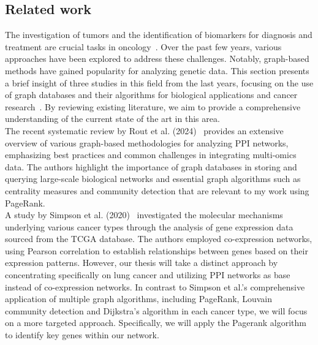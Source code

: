 \subsection{Related work} \label{subsec:related_work}
The investigation of tumors and the identification of biomarkers for diagnosis and treatment are crucial tasks in oncology~\cite{das2024biomarkers}.
Over the past few years, various approaches have been explored to address these challenges.
Notably, graph-based methods have gained popularity for analyzing genetic data.
This section presents a brief insight of three studies in this field from the last years,
focusing on the use of graph databases and their algorithms for biological applications and
cancer research~\cite{rout2024systematic, simpson2020applying, shan2020network}.
By reviewing existing literature, we aim to provide a comprehensive understanding of the current state of the art in this area.
\\

The recent systematic review by Rout et al. (2024)~\cite{rout2024systematic} provides an extensive overview of
various graph-based methodologies for analyzing PPI networks,
emphasizing best practices and common challenges in integrating multi-omics data.
The authors highlight the importance of graph databases in storing and querying large-scale biological networks
and essential graph algorithms such as centrality measures and community detection that are relevant to my work using PageRank.
\\

A study by Simpson et al. (2020)~\cite{simpson2020applying} investigated the molecular mechanisms underlying various cancer types
through the analysis of gene expression data sourced from the TCGA database.
The authors employed co-expression networks, using Pearson correlation to establish relationships between genes based on their expression patterns.
However, our thesis will take a distinct approach by concentrating specifically on lung cancer
and utilizing PPI networks as base instead of co-expression networks.
In contrast to Simpson et al.'s comprehensive application of multiple graph algorithms, including PageRank,
Louvain community detection and Dijkstra's algorithm in each cancer type, we will focus on a more targeted approach.
Specifically, we will apply the Pagerank algorithm to identify key genes within our network.
\\

